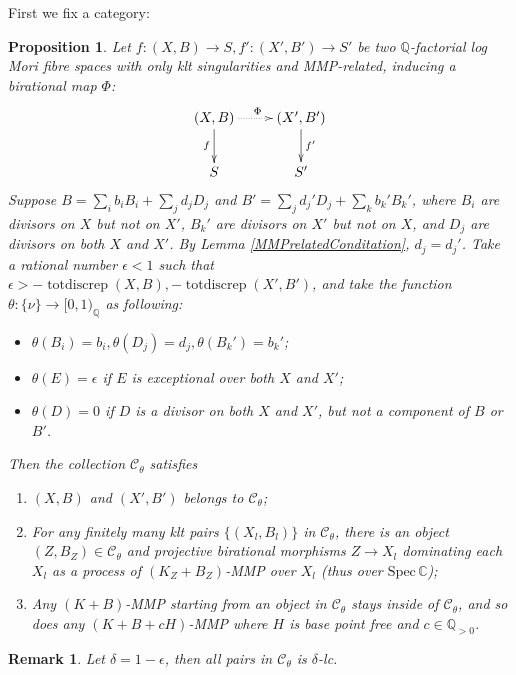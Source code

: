 \documentclass{article}
\newtheorem{prop}[defn]{Proposition}
\newtheorem{rmk}[defn]{Remark}
\begin{document}
First we fix a category: 
\begin{prop}\label{cat}
  \cite[Lemma 3.6]{brunoLogSarkisovProgram1995}
  Let $ f:(X,B)\to S,f':(X',B')\to S' $ be two $ \mathbb{Q} $-factorial log Mori fibre spaces  with only klt singularities and MMP-related, inducing a birational map $\Phi$:
  \[ \xymatrix{
      (X,B)\ar[d]_f\ar@{.>}[r]^\Phi&(X',B')\ar[d]^{f'}\\
 S&S'} \]
 Suppose  $ B=\sum_ib_iB_i+\sum_jd_jD_j $ and $ B'=\sum_jd_j'D_j+\sum_kb_k'B_k' $, where $ B_i $ are divisors on $ X $ but not on $ X' $, $ B_k' $ are divisors on $ X' $ but not on $ X $, and $ D_j $ are divisors on both $ X $ and $ X' $. By Lemma \ref{MMPrelatedConditation}, $ d_j=d_j' $. Take a rational number $ \epsilon<1 $ such that $ \epsilon> -\operatorname{totdiscrep}(X,B),-\operatorname{totdiscrep}(X',B') $, and take the function $ \theta:\{\nu\}\to [0,1)_\mathbb{Q} $ as following:
  \begin{itemize}
    \item $ \theta(B_i)=b_i, \theta(D_j)=d_j,\theta(B_k')=b_k'$;
    \item $ \theta(E)=\epsilon $ if $ E $ is exceptional over both $ X $ and $ X' $;
    \item $ \theta(D)=0 $ if $ D $ is a divisor on both $ X $ and $ X' $, but not a component of $ B $ or $ B' $.
  \end{itemize}
  Then the collection $ \mathcal{C}_\theta $ satisfies
  \begin{enumerate}
    \item $ (X,B) $ and $ (X',B') $ belongs to $ \mathcal{C}_\theta $;
    \item For any finitely many klt pairs $ \{(X_l,B_l)\} $ in $ \mathcal{C}_\theta $, there is an object $ (Z,B_Z)\in \mathcal{C}_\theta $ and projective birational morphisms $ Z\to X_l $ dominating each  $ X_l $ as a process of $ (K_{Z}+B_{Z}) $-MMP over $ X_l $ (thus over $ \mathrm{Spec}\,\mathbb{C} $);
    \item Any $ (K+B) $-MMP starting from an object in $ \mathcal{C}_\theta $ stays inside of $ \mathcal{C}_\theta $, and so does any $ (K+B+cH) $-MMP where $ H $ is base point free and $ c\in \mathbb{Q}_{>0} $. 
  \end{enumerate}
\end{prop}
\begin{rmk}
Let $\delta=1-\epsilon$, then all pairs in $\mathcal{C}_{\theta}$ is $\delta$-lc. 
\end{rmk}
\end{document}

